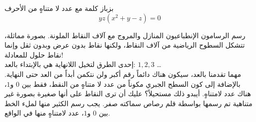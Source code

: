 \begin{surferPage}[بزباز]{بزباز }
 كلمة مع عدد لا متناهٍ من الأحرف \\
\smallskip
\[y z (x^2	+ y - z) = 0\]

\vspace{0.3cm}
رسم الرسامون الإنطباعيون المنازل والمروج مع آلاف النقاط الملونة. بصورة مماثلة، تتشكل السطوح الرياضية من آلاف النقاط، ولكنها نقاط بدون عرض وبدون  ثقل وإنما نقاط حلول للمعادلة! \\

\vspace{0.3cm}
إحدى الطرق لتخيل اللانهاية هي بالإبتداء بالعد:
$ 1,2,3 $ \dots
\\
مهما تقدمنا بالعد، سيكون هناك دائماً رقم أكبر ولن نتكمن أبداً من العد حتى النهاية.
\vspace{0.3cm}
بالإضافة إلى كون السطح الجبري مكوناً من عدد لا متناهٍ من النقط، فقط بين $0$ و$1$، هناك عدد لامتناهٍ. أيبدو ذلك مستحيلاً؟ عليك أن ترى النقاط على أنها صغيرة بصورة غير متناهية تم رسمها بواسطة قلم رصاص سماكته صفر. يجب رسم الكثير منها لملء الخط بين $0$ و$1$، عدد لامتناهٍ منها في الواقع.
\end{surferPage}
